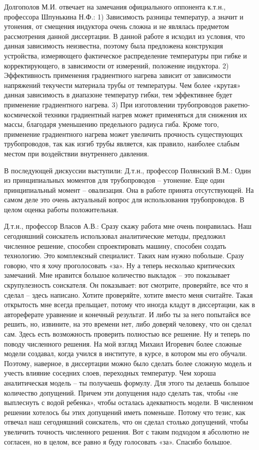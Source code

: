 Долгополов М.И. отвечает на замечания официального оппонента к.т.н., профессора Шпунькина Н.Ф.:
1) Зависимость разницы температур, а значит и утонения, от смещения индуктора очень сложна и не являлась предметом рассмотрения данной диссертации. В данной работе я исходил из условия, что данная зависимость неизвестна, поэтому была предложена конструкция устройства, измеряющего фактическое распределение температуры при гибке и корректирующего, в зависимости от измерений, положение индуктора.
2) Эффективность применения градиентного нагрева зависит от зависимости напряжений текучести материала трубы от температуры. Чем более «крутая» данная зависимость в диапазоне температур гибки, тем эффективнее будет применение градиентного нагрева.
3) При изготовлении трубопроводов ракетно-космической техники градиентный нагрев может применяться для снижения их массы, благодаря уменьшению предельного радиуса гиба. Кроме того, применение градиентного нагрева может увеличить прочность существующих трубопроводов, так как изгиб трубы является, как правило, наиболее слабым местом при воздействии внутреннего давления.


В последующей дискуссии выступили:
Д.т.н., профессор Полянский В.М.: 
Один из принципиальных моментов для трубопроводов – утонение. Еще один принципиальный момент – овализация. Она в работе принята отсутствующей. На самом деле это очень актуальный вопрос для использования трубопроводов. В целом оценка работы положительная.

Д.т.н., профессор Власов А.В.: 
Сразу скажу работа мне очень понравилась. Наш сегодняшний соискатель использовал аналитические методы, предложил численное решение, способен спроектировать машину, способен создать технологию. Это комплексный специалист. Таких нам нужно побольше. Сразу говорю, что я хочу проголосовать «за». Ну а теперь несколько критических замечаний. Мне нравится большое количество выкладок – это показывает скрупулезность соискателя. Он показывает: вот смотрите, проверяйте, все что я сделал – здесь написано. Хотите проверяйте, хотите вместо меня считайте. Такая открытость мне всегда прельщает, потому что иногда кладут в диссертации, как в автореферате уравнение и конечный результат. И либо ты за него попытайся все решить, но, извините, на это времени нет, либо доверяй человеку, что он сделал сам. Здесь есть возможность проверить полностью все решение. Ну и теперь по поводу численного решения. На мой взгляд Михаил Игоревич более сложные модели создавал, когда учился в институте, в курсе, в котором мы его обучали. Поэтому, наверное, в диссертации можно было сделать более сложную модель и учесть влияние соседних слоев, переходных температур. Чем хороша аналитическая модель – ты получаешь формулу. Для этого ты делаешь большое количество допущений. Причем эти допущения надо сделать так, чтобы «не выплеснуть с водой ребенка», чтобы осталась адекватность модели. В численном решении хотелось бы этих допущений иметь поменьше. Потому что тезис, как отвечал наш сегодняшний соискатель, что он сделал столько допущений, чтобы увеличить точность численного решения. Вот с таким подходом я абсолютно не согласен, но в целом, все равно я буду голосовать «за». Спасибо большое.


